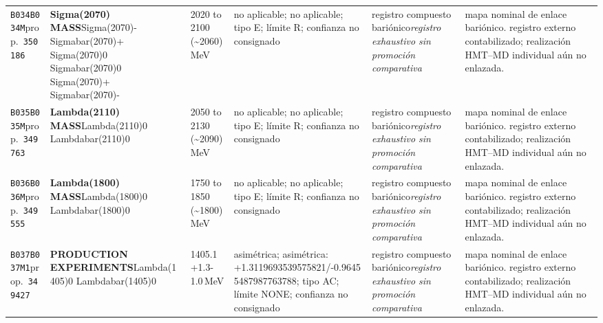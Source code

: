 \begin{landscape}
\begin{longtable}{L{1.85cm}L{4.45cm}L{2.35cm}L{4.05cm}L{3.35cm}L{7.15cm}}
\texttt{B034}\newline \texttt{B034M}\newline prop.\ \texttt{350186} & \textbf{Sigma(2070) MASS}\newline Sigma(2070)- \textbar{}\allowbreak{} Sigmabar(2070)+ \textbar{}\allowbreak{} Sigma(2070)0 \textbar{}\allowbreak{} Sigmabar(2070)0 \textbar{}\allowbreak{} Sigma(2070)+ \textbar{}\allowbreak{} Sigmabar(2070)- & 2020 to 2100 (\textasciitilde{}2060)\,MeV & no aplicable; no aplicable; tipo E; límite R; confianza no consignado & registro compuesto bariónico\newline \emph{registro exhaustivo sin promoción comparativa} & mapa nominal de enlace bariónico. registro externo contabilizado; realización HMT--MD individual aún no enlazada. \\
\texttt{B035}\newline \texttt{B035M}\newline prop.\ \texttt{349763} & \textbf{Lambda(2110) MASS}\newline Lambda(2110)0 \textbar{}\allowbreak{} Lambdabar(2110)0 & 2050 to 2130 (\textasciitilde{}2090)\,MeV & no aplicable; no aplicable; tipo E; límite R; confianza no consignado & registro compuesto bariónico\newline \emph{registro exhaustivo sin promoción comparativa} & mapa nominal de enlace bariónico. registro externo contabilizado; realización HMT--MD individual aún no enlazada. \\
\texttt{B036}\newline \texttt{B036M}\newline prop.\ \texttt{349555} & \textbf{Lambda(1800) MASS}\newline Lambda(1800)0 \textbar{}\allowbreak{} Lambdabar(1800)0 & 1750 to 1850 (\textasciitilde{}1800)\,MeV & no aplicable; no aplicable; tipo E; límite R; confianza no consignado & registro compuesto bariónico\newline \emph{registro exhaustivo sin promoción comparativa} & mapa nominal de enlace bariónico. registro externo contabilizado; realización HMT--MD individual aún no enlazada. \\
\texttt{B037}\newline \texttt{B037M1}\newline prop.\ \texttt{349427} & \textbf{PRODUCTION EXPERIMENTS}\newline Lambda(1405)0 \textbar{}\allowbreak{} Lambdabar(1405)0 & 1405.1+1.3-1.0\,MeV & asimétrica; asimétrica: +1.3119693539575821/-0.96455487987763788; tipo AC; límite NONE; confianza no consignado & registro compuesto bariónico\newline \emph{registro exhaustivo sin promoción comparativa} & mapa nominal de enlace bariónico. registro externo contabilizado; realización HMT--MD individual aún no enlazada. \\

\end{longtable}
\end{landscape}
